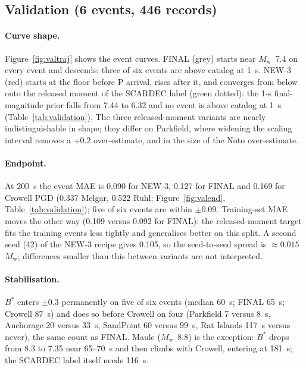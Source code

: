 \documentclass[12pt,letterpaper]{article}
\newcommand{\Mw}{M_{\mathrm{w}}}
\begin{document}
\subsection{Validation (6 events, 446 records)}

\paragraph{Curve shape.} Figure~\ref{fig:valtraj} shows the event curves. FINAL (grey) starts near $\Mw$~7.4 on every event and descends; three of six events are above catalog at 1~s. NEW-3 (red) starts at the floor before P arrival, rises after it, and converges from below onto the released moment of the SCARDEC label (green dotted): the 1-s final-magnitude prior falls from 7.44 to 6.32 and no event is above catalog at 1~s (Table~\ref{tab:validation}). The three released-moment variants are nearly indistinguishable in shape; they differ on Parkfield, where widening the scaling interval removes a $+0.2$ over-estimate, and in the size of the Noto over-estimate.

\paragraph{Endpoint.} At 200~s the event MAE is 0.090 for NEW-3, 0.127 for FINAL and 0.169 for Crowell PGD (0.337 Melgar, 0.522 Ruhl; Figure~\ref{fig:valend}, Table~\ref{tab:validation}); five of six events are within $\pm0.09$. Training-set MAE moves the other way (0.109 versus 0.092 for FINAL): the released-moment target fits the training events less tightly and generalises better on this split. A second seed (42) of the NEW-3 recipe gives 0.105, so the seed-to-seed spread is $\approx0.015$~$\Mw$; differences smaller than this between variants are not interpreted.

\paragraph{Stabilisation.} $B^*$ enters $\pm0.3$ permanently on five of six events (median 60~s; FINAL 65~s; Crowell 87~s) and does so before Crowell on four (Parkfield 7 versus 8~s, Anchorage 20 versus 33~s, SandPoint 60 versus 99~s, Rat Islands 117~s versus never), the same count as FINAL. Maule ($\Mw$~8.8) is the exception: $B^*$ drops from 8.3 to 7.35 near 65--70~s and then climbs with Crowell, entering at 181~s; the SCARDEC label itself needs 116~s.
\end{document}
